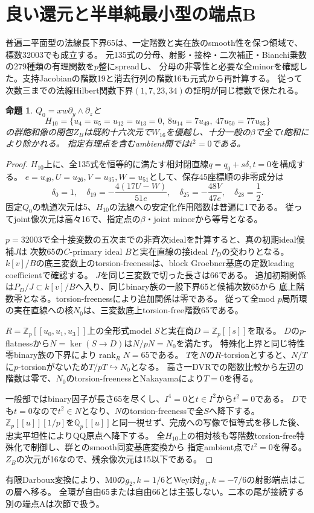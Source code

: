 \documentclass[11pt,a4paper]{ltjsarticle}
\DeclareMathOperator{\rank}{rank}
\newtheorem{proposition}[theorem]{命題}
\theoremstyle{remark}
\begin{document}
\section{良い還元と半単純最小型の端点B}
普遍二平面型の法線長下界65は、一定階数と実在族のsmooth性を保つ領域で、標数32003でも成立する。
元135式の分母、射影・接枠・二次補正・Bianchi乗数の279種類の有理関数を$p$整にspreadし、
分母の非零性と必要な全minorを確認した。支持Jacobianの階数19と消去行列の階数16も元式から再計算する。
従って次数三までの法線Hilbert関数下界$(1,7,23,34)$の証明が同じ標数で保たれる\cite{binary-prime-v43}。

\begin{proposition}
$Q_0=xw\partial_y\wedge\partial_z$と
\[
 H_{10}=\{u_4=u_5=u_{12}=u_{13}=0,\ 8u_{14}=7u_{49},\ 47u_{50}=77u_{35}\}
\]
の群飽和像の閉包$Z_B$は既約十六次元で$W_{16}$を優越し、十分一般の$\beta$で全て$t$飽和により除かれる。
指定有理点を含むambient開では$t^2=0$である。
\end{proposition}
\begin{proof}
$H_{10}$上に、全135式を恒等的に満たす相対閉直線$q=q_0+s\delta,t=0$を構成する。
$e=u_{49},U=u_{26},V=u_{35},W=u_{51}$として、保存45座標順の非零成分は
\[
 \delta_0=1,\quad \delta_{19}=-\frac{4(17U-W)}{51e},\quad
 \delta_{25}=-\frac{48V}{47e},\quad \delta_{28}=\frac12.
\]
固定$Q_0$の軌道次元は5、$H_{10}$の法線への安定化作用階数は普遍に1である。
従ってjoint像次元は高々16で、指定点の$\beta$・joint minorから等号となる。

$p=32003$で全十接変数の五次までの非斉次idealを計算すると、真の初期ideal候補$J$は
次数65の$C$-primary ideal $B$と実在直線の接ideal $P_D$の交わりとなる。
$k[v]/B$の底三変数上のtorsion-freenessは、block Groebner基底の定数leading coefficientで確認する。
$J$を同じ三変数で切った長さは66である。
追加初期関係は$P_D/J\subset k[v]/B$へ入り、同じbinary族の一般下界65と候補次数65から
底上階数零となる。torsion-freenessにより追加関係は零である。
従って全mod $p$局所環の実在直線への核$N_0$は、三変数底上torsion-free階数65である。

$R=\mathbb Z_p[[u_0,u_1,u_3]]$上の全形式model $S$と実在商$D=\mathbb Z_p[[s]]$を取る。
$D$の$p$-flatnessから$N=\ker(S\to D)$は$N/pN=N_0$を満たす。
特殊化上界と同じ特性零binary族の下界により$\rank_R N=65$である。
$T$を$N$の$R$-torsionとすると、$N/T$に$p$-torsionがないため$T/pT\hookrightarrow N_0$となる。
高さ一DVRでの階数比較から左辺の階数は零で、$N_0$のtorsion-freenessとNakayamaにより$T=0$を得る。

一般部ではbinary因子が長さ65を尽くし、$I^4=0$と$t\in I^2$から$t^2=0$である。
$D$でも$t=0$なので$t^2\in N$となり、$N$のtorsion-freenessで全$S$へ降下する。
$\mathbb Z_p[[u]][1/p]$を$\mathbb Q_p[[u]]$と同一視せず、完成への写像で恒等式を移した後、
忠実平坦性によりQQ原点へ降下する。
全$H_{10}$上の相対核も等階数torsion-free特殊化で制御し、群とのsmooth同変基底変換から
指定ambient点で$t^2=0$を得る。$Z_B$の次元が16なので、残余像次元は15以下である\cite{semi-b-v43}。
\end{proof}
有限Darboux変換により、M0の$g_2,k=1/6$とWeyl対$g_4,k=-7/6$の射影端点はこの層へ移る。
全環が自由65または自由66とは主張しない。二本の尾が接続する別の端点Aは次節で扱う。
\end{document}
